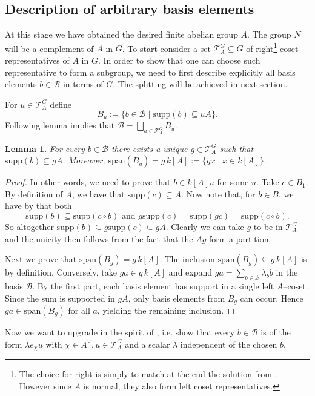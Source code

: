 \documentclass[a4paper,10pt]{amsart}
\newtheorem{lemma}{Lemma}[section]
\theoremstyle{definition}
\theoremstyle{remark}
\newcommand{\Supp}{\mathrm{supp}}
\newcommand{\Span}{\mathrm{span}}
\newcommand\mc{\mathcal}
\begin{document}
\subsection{Description of arbitrary basis elements}\label{sectie group N}

At this stage we have obtained the desired finite abelian group $A$. The group $N$ will be a complement of $A$ in $G$. To start consider a set $\mc{T}_A^G\subseteq G$ of right\footnote{The choice for right is simply to match at the end the solution from . However since $A$ is normal, they also form left coset representatives.} coset representatives of $A$ in $G$. In order to show that one can choose such representative to form a subgroup, we need to first describe explicitly all basis elements $b \in \mc{B}$ in terms of $G$. The splitting will be achieved in next section.

For $u\in \mc{T}_A^G$ define
$$
B_u:=\{b\in \mc{B} \mid \Supp(b)\subseteq uA\}.
$$
Following lemma implies that $\mc{B}=\bigsqcup_{u\in \mc{T}_A^G} B_u$.
\begin{lemma}\label{lem:single-coset}
For every $b\in \mc{B}$ there exists a unique $g\in \mc{T}^G_A$ such that $\Supp(b)\subseteq gA$. Moreover, $\Span(B_{g})=g\,k[A]:= \{g x \mid x \in k[A] \}.$
\end{lemma}
\begin{proof}
In other words, we need to prove that $b\in k[A]u$ for some $u$. Take $c \in B_1$. By definition of $A$, we have that $\Supp(c) \subseteq A$. Now note that, for $b\in B$, we have by  that both 
$$\Supp(b) \subseteq \Supp(c \circ b) \text{ and } g\Supp(c) = \Supp(gc) = \Supp(c\circ b).$$
So altogether $\Supp(b) \subseteq g \Supp(c) \subseteq gA$. Clearly we can take $g$ to be in $\mc{T}^G_A$ and the unicity then follows from the fact that the $Ag$ form a partition. 

Next we prove that $\Span(B_{g})=g\,k[A]$. The inclusion $\Span(B_{g})\subseteq g\,k[A]$ is by definition. Conversely, take $ga \in g\, k[A]$ and expand $ga= \sum_{b \in \mc{B}}\lambda_b b$ in the basis $\mc{B}$. By the first part, each basis element has support in a single left $A$--coset. Since the sum is supported in $gA$, only basis elements from $B_{g}$ can occur. Hence $ga\in \Span(B_{g})$ for all $a$, yielding the remaining inclusion.

\end{proof}

Now we want to upgrade  in the spirit of , i.e. show that every $b \in \mc{B}$ is of the form $\lambda e_{\chi} u$ with $\chi \in A^{\vee}, u \in \mc{T}_A^G$ and a scalar $\lambda$ independent of the chosen $b$.
\end{document}
